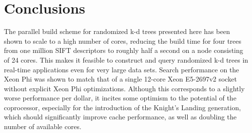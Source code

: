 \section{Conclusions}
\label{sec:conclusions}


The parallel build scheme for randomized k-d trees presented here has been shown to scale to a high number of cores, reducing the build time for four trees from one million SIFT descriptors to roughly half a second on a node consisting of 24 cores. This makes it feasible to construct and query randomized k-d trees in real-time applications even for very large data sets. Search performance on the Xeon Phi was shown to match that of a single 12-core Xeon E5-2697v2 socket
without explicit Xeon Phi optimizations. Although this corresponds to a slightly worse performance per dollar, it incites some optimism to the potential of the coprocessor, especially for the introduction of the Knight's Landing generation, which should significantly improve cache performance, as well as doubling the number of available cores. 

